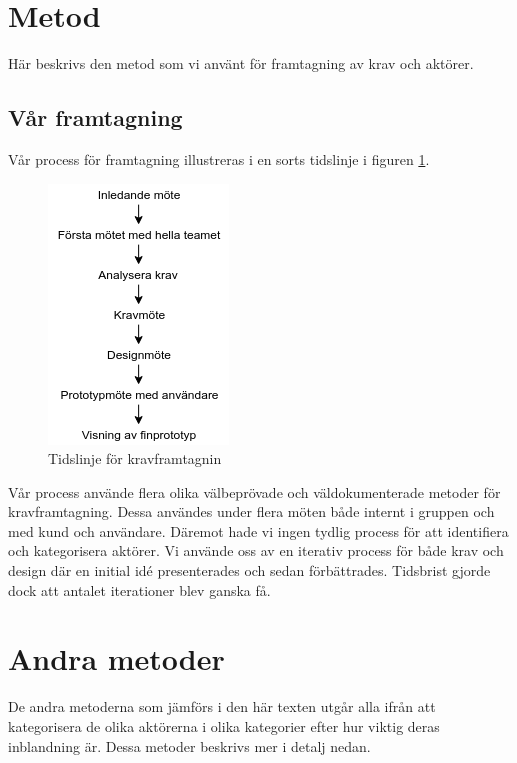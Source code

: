 \section{Metod}
Här beskrivs den metod som vi använt för framtagning av krav och aktörer.
\subsection{Vår framtagning}
Vår process för framtagning illustreras i en sorts tidslinje i figuren \ref{fig:ch_timeline}.

\begin{figure}[h]
	\centering
	\includegraphics[height=0.7\textwidth]{Figures/timeline_meetings.png}
	\caption{Tidslinje för kravframtagnin}
	\label{fig:ch_timeline}
\end{figure}

Vår process använde flera olika välbeprövade och väldokumenterade metoder för kravframtagning. Dessa användes under flera möten både internt i gruppen och med kund och användare. Däremot hade vi ingen tydlig process för att identifiera och kategorisera aktörer. Vi använde oss av en iterativ process för både krav och design där en initial idé presenterades och sedan förbättrades. Tidsbrist gjorde dock att antalet iterationer blev ganska få.

\section{Andra metoder}
De andra metoderna som jämförs i den här texten utgår alla ifrån att kategorisera de olika aktörerna i olika kategorier efter hur viktig deras inblandning är. Dessa metoder beskrivs mer i detalj nedan.

